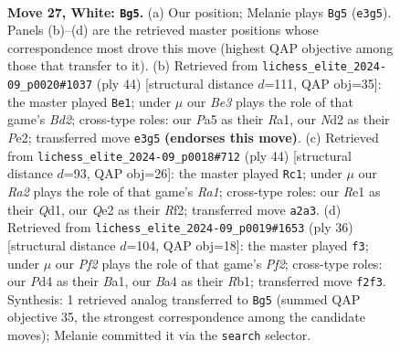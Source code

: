 \documentclass[11pt]{article}
\begin{document}
\clearpage

\begin{figure}[p]\centering
\begin{subfigure}{0.46\textwidth}\centering
\resizebox{\linewidth}{!}{%
\newchessgame
\chessboard[
  setfen={rnbr4/pp2qpbk/4pnp1/P2p3p/B2P3P/4B1P1/RPPNQP2/1N2R1K1 w - - 7 27},
  showmover=false,
  pgfstyle=straightmove, color=movearrow, markmove={e3-g5}
]}
\caption{}
\end{subfigure}\hfill
\begin{subfigure}{0.46\textwidth}\centering
\resizebox{\linewidth}{!}{%
\newchessgame
\chessboard[
  setfen={r1rq1nk1/5pp1/1p2pn1p/p2p4/P1bP3P/2N1QPP1/1P1BP1B1/R1R3K1 w - - 1 23},
  showmover=false,
  pgfstyle=straightmove, color=movearrow, markmove={d2-e1}
]}
\caption{}
\end{subfigure}
\\[4pt]
\begin{subfigure}{0.46\textwidth}\centering
\resizebox{\linewidth}{!}{%
\newchessgame
\chessboard[
  setfen={rb1q3k/p6p/1p2bnn1/3p1pr1/NP1Pp3/P3P3/1B2BRPP/R2Q1N1K w - - 0 23},
  showmover=false,
  pgfstyle=straightmove, color=movearrow, markmove={a1-c1}
]}
\caption{}
\end{subfigure}\hfill
\begin{subfigure}{0.46\textwidth}\centering
\resizebox{\linewidth}{!}{%
\newchessgame
\chessboard[
  setfen={r1b2rk1/2q1ppbp/3p1np1/2pP4/n1P5/1N2P3/4BPPP/BR1QNRK1 w - - 2 19},
  showmover=false,
  pgfstyle=straightmove, color=movearrow, markmove={f2-f3}
]}
\caption{}
\end{subfigure}
\caption{\textbf{Move 27, White: \texttt{Bg5}.} (a) Our position; Melanie plays \texttt{Bg5} (\texttt{e3g5}). Panels (b)--(d) are the retrieved master positions whose correspondence most drove this move (highest QAP objective among those that transfer to it). (b) Retrieved from \texttt{lichess\_elite\_2024-09\_p0020\#1037} (ply 44) [structural distance $d$=111, QAP obj=35]: the master played \texttt{Be1}; under $\mu$ our \emph{Be3} plays the role of that game's \emph{Bd2}; cross-type roles: our \emph{P}a5 as their \emph{R}a1, our \emph{N}d2 as their \emph{P}e2; transferred move \texttt{e3g5} \textbf{(endorses this move)}. (c) Retrieved from \texttt{lichess\_elite\_2024-09\_p0018\#712} (ply 44) [structural distance $d$=93, QAP obj=26]: the master played \texttt{Rc1}; under $\mu$ our \emph{Ra2} plays the role of that game's \emph{Ra1}; cross-type roles: our \emph{R}e1 as their \emph{Q}d1, our \emph{Q}e2 as their \emph{R}f2; transferred move \texttt{a2a3}. (d) Retrieved from \texttt{lichess\_elite\_2024-09\_p0019\#1653} (ply 36) [structural distance $d$=104, QAP obj=18]: the master played \texttt{f3}; under $\mu$ our \emph{Pf2} plays the role of that game's \emph{Pf2}; cross-type roles: our \emph{P}d4 as their \emph{B}a1, our \emph{B}a4 as their \emph{R}b1; transferred move \texttt{f2f3}. Synthesis: 1 retrieved analog transferred to \texttt{Bg5} (summed QAP objective 35, the strongest correspondence among the candidate moves); Melanie committed it via the \texttt{search} selector.}
\label{fig:thought-m52}
\end{figure}
\end{document}
